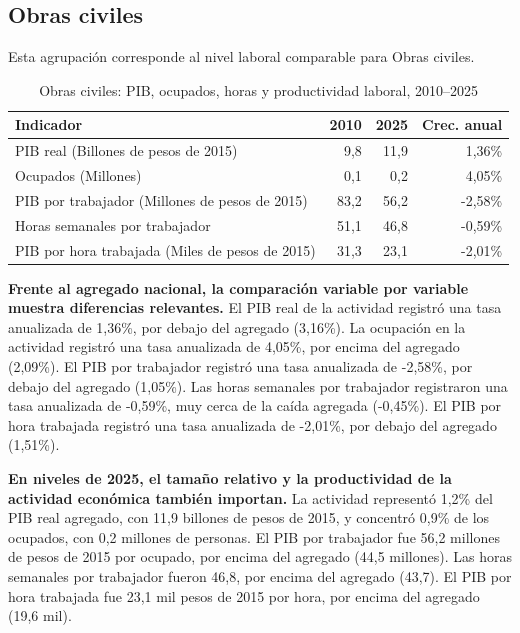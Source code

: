 \subsection{Obras civiles}

Esta agrupación corresponde al nivel laboral comparable para Obras civiles.

\begin{table}[H]
\centering
\caption{Obras civiles: PIB, ocupados, horas y productividad laboral, 2010--2025}
\label{tab:agg25_f02_productividad}
\small
\begin{tabular}{lrrr}
\toprule
Indicador & 2010 & 2025 & Crec. anual \\
\midrule
PIB real  (Billones de pesos de 2015) & 9,8 & 11,9 & 1,36\% \\
Ocupados (Millones) & 0,1 & 0,2 & 4,05\% \\
PIB por trabajador (Millones de pesos de 2015) & 83,2 & 56,2 & -2,58\% \\
Horas semanales por trabajador & 51,1 & 46,8 & -0,59\% \\
PIB por hora trabajada (Miles de pesos de 2015) & 31,3 & 23,1 & -2,01\% \\
\bottomrule
\end{tabular}
\end{table}

\textbf{Frente al agregado nacional, la comparación variable por variable muestra diferencias relevantes.} El PIB real de la actividad registró una tasa anualizada de 1,36\%, por debajo del agregado (3,16\%). La ocupación en la actividad registró una tasa anualizada de 4,05\%, por encima del agregado (2,09\%). El PIB por trabajador registró una tasa anualizada de -2,58\%, por debajo del agregado (1,05\%). Las horas semanales por trabajador registraron una tasa anualizada de -0,59\%, muy cerca de la caída agregada (-0,45\%). El PIB por hora trabajada registró una tasa anualizada de -2,01\%, por debajo del agregado (1,51\%).

\textbf{En niveles de 2025, el tamaño relativo y la productividad de la actividad económica también importan.} La actividad representó 1,2\% del PIB real agregado, con 11,9 billones de pesos de 2015, y concentró 0,9\% de los ocupados, con 0,2 millones de personas. El PIB por trabajador fue 56,2 millones de pesos de 2015 por ocupado, por encima del agregado (44,5 millones). Las horas semanales por trabajador fueron 46,8, por encima del agregado (43,7). El PIB por hora trabajada fue 23,1 mil pesos de 2015 por hora, por encima del agregado (19,6 mil).

